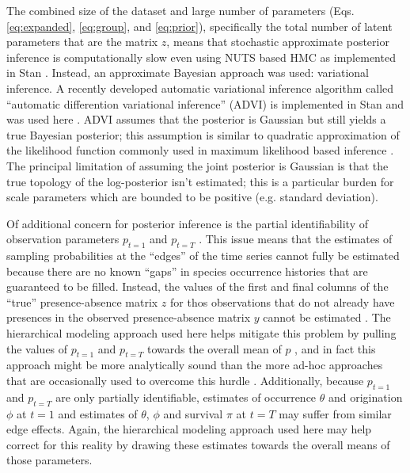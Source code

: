 \documentclass[12pt,letterpaper]{article}
\begin{document}

The combined size of the dataset and large number of parameters (Eqs. \ref{eq:expanded}, \ref{eq:group}, and \ref{eq:prior}), specifically the total number of latent parameters that are the matrix \(z\), means that stochastic approximate posterior inference is computationally slow even using NUTS based HMC as implemented in Stan \citep{StanDevelopmentTeam2016}. Instead, an approximate Bayesian approach was used: variational inference. A recently developed automatic variational inference algorithm called ``automatic differention variational inference'' (ADVI) is implemented in Stan and was used here \citep{Kucukelbir2015,StanDevelopmentTeam2016}. ADVI assumes that the posterior is Gaussian but still yields a true Bayesian posterior; this assumption is similar to quadratic approximation of the likelihood function commonly used in maximum likelihood based inference \citep{McElreath2016}. The principal limitation of assuming the joint posterior is Gaussian is that the true topology of the log-posterior isn't estimated; this is a particular burden for scale parameters which are bounded to be positive (e.g. standard deviation).

Of additional concern for posterior inference is the partial identifiability of observation parameters \(p_{t = 1}\) and \(p_{t = T}\) \citep{Royle2008}. This issue means that the estimates of sampling probabilities at the ``edges'' of the time series cannot fully be estimated because there are no known ``gaps'' in species occurrence histories that are guaranteed to be filled. Instead, the values of the first and final columns of the ``true'' presence-absence matrix \(z\) for thos observations that do not already have presences in the observed presence-absence matrix \(y\) cannot be estimated \citep{Royle2008}. The hierarchical modeling approach used here helps mitigate this problem by pulling the values of \(p_{t = 1}\) and \(p_{t = T}\) towards the overall mean of \(p\) \citep{Gelman2013d}, and in fact this approach might be more analytically sound than the more ad-hoc approaches that are occasionally used to overcome this hurdle \citep{Royle2008}. Additionally, because \(p_{t = 1}\) and \(p_{t = T}\) are only partially identifiable, estimates of occurrence \(\theta\) and origination \(\phi\) at \(t = 1\) and estimates of \(\theta\), \(\phi\) and survival \(\pi\) at \(t = T\) may suffer from similar edge effects. Again, the hierarchical modeling approach used here may help correct for this reality by drawing these estimates towards the overall means of those parameters.
\end{document}
